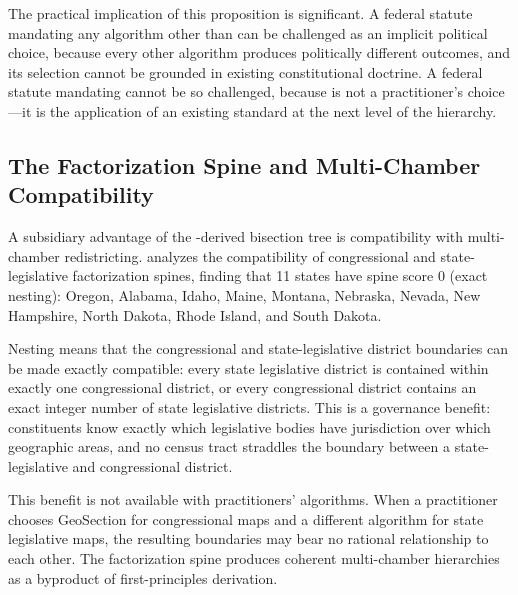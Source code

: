 The practical implication of this proposition is significant.
A federal statute mandating any algorithm other than \ar{} can be challenged
as an implicit political choice, because every other algorithm produces
politically different outcomes, and its selection cannot be grounded in
existing constitutional doctrine.
A federal statute mandating \ar{} cannot be so challenged, because \ar{}
is not a practitioner's choice---it is the application of an existing
standard at the next level of the hierarchy.

\subsection{The Factorization Spine and Multi-Chamber Compatibility}

A subsidiary advantage of the \hh{}-derived bisection tree is compatibility
with multi-chamber redistricting.
\citet{b13paper} analyzes the compatibility of congressional and state-legislative
factorization spines, finding that 11 states have spine score 0 (exact
nesting): Oregon, Alabama, Idaho, Maine, Montana, Nebraska, Nevada,
New Hampshire, North Dakota, Rhode Island, and South Dakota.

Nesting means that the congressional and state-legislative district boundaries
can be made exactly compatible: every state legislative district is contained
within exactly one congressional district, or every congressional district
contains an exact integer number of state legislative districts.
This is a governance benefit: constituents know exactly which legislative
bodies have jurisdiction over which geographic areas, and no census tract
straddles the boundary between a state-legislative and congressional district.

This benefit is not available with practitioners' algorithms.
When a practitioner chooses GeoSection for congressional maps and
a different algorithm for state legislative maps, the resulting boundaries
may bear no rational relationship to each other.
The \hh{} factorization spine produces coherent multi-chamber hierarchies
as a byproduct of first-principles derivation.

